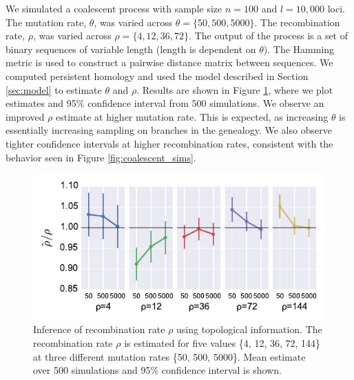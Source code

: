 We simulated a coalescent process with sample size $n=100$ and $l=10{,}000$ loci.
The mutation rate, $\theta$, was varied across $\theta=\{50,500,5000\}$.
The recombination rate, $\rho$, was varied across $\rho=\{4,12,36,72\}$.
The output of the process is a set of binary sequences of variable length (length is dependent on $\theta$).
The Hamming metric is used to construct a pairwise distance matrix between sequences.
We computed persistent homology and used the model described in Section \ref{sec:model} to estimate $\theta$ and $\rho$.
Results are shown in Figure \ref{fig:param_inference}, where we plot estimates and 95\% confidence interval from $500$ simulations.
We observe an improved $\rho$ estimate at higher mutation rate.
This is expected, as increasing $\theta$ is essentially increasing sampling on branches in the genealogy.
We also observe tighter confidence intervals at higher recombination rates, consistent with the behavior seen in Figure \ref{fig:coalescent_sims}.

\begin{figure}
\begin{center}
\centerline{\includegraphics[width=\columnwidth]{./fig/param_inference.pdf}}
\caption{Inference of recombination rate $\rho$ using topological information. The recombination rate $\rho$ is estimated for five values \{4, 12, 36, 72, 144\} at three different mutation rates \{50, 500, 5000\}. Mean estimate over 500 simulations and 95\% confidence interval is shown.}
\label{fig:param_inference}
\end{center}
\end{figure}